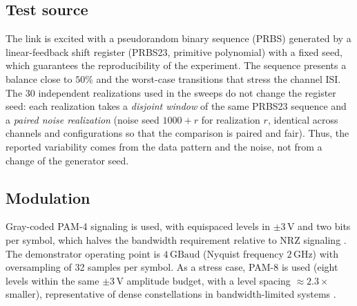 \documentclass[twocolumn]{USG}
\begin{document}
\subsection{Test source}
The link is excited with a pseudorandom binary sequence (PRBS) generated by
a linear-feedback shift register (PRBS23, primitive polynomial) with a fixed
seed, which guarantees the reproducibility of the experiment. The sequence
presents a balance close to $50\%$ and the worst-case transitions that
stress the channel ISI. The 30 independent realizations used in the sweeps
do not change the register seed: each realization takes a \emph{disjoint
window} of the same PRBS23 sequence and a \emph{paired noise realization}
(noise seed $1000{+}r$ for realization $r$, identical across channels and
configurations so that the comparison is paired and fair). Thus, the
reported variability comes from the data pattern and the noise, not from a
change of the generator seed.

\subsection{Modulation}
Gray-coded PAM-4 signaling is used, with equispaced levels in
$\pm 3\,\mathrm{V}$ and two bits per symbol, which halves the bandwidth
requirement relative to NRZ signaling \cite{7964959}. The demonstrator
operating point is $4\,\mathrm{GBaud}$ (Nyquist frequency $2\,\mathrm{GHz}$)
with oversampling of 32 samples per symbol. As a stress case, PAM-8 is used
(eight levels within the same $\pm 3\,\mathrm{V}$ amplitude budget, with a
level spacing $\approx 2.3\times$ smaller), representative of dense
constellations in bandwidth-limited systems \cite{8963973}.
\end{document}
